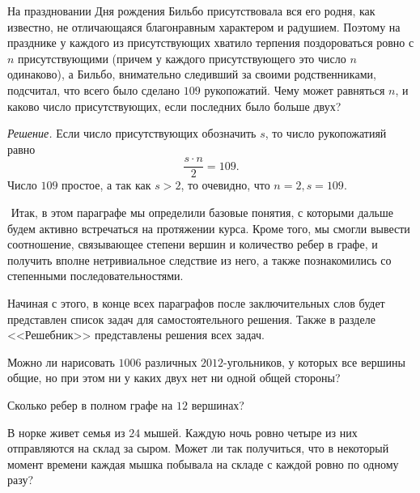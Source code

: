 \begin{example}
	На праздновании Дня рождения Бильбо присутствовала вся его родня, как известно, не отличающаяся благонравным характером и радушием. 
	Поэтому на празднике у каждого из присутствующих хватило терпения поздороваться ровно с $n$ присутствующими 
	(причем у каждого присутствующего это число $n$ одинаково), а Бильбо, внимательно следивший за своими родственниками, 
	подсчитал, что всего было сделано $109$ рукопожатий. Чему может равняться $n$, и каково число присутствующих, если последних было больше двух?
	
	\emph{Решение.} Если число присутствующих обозначить $s$, то число рукопожатияй равно $$\frac{s \cdot n}{2} = 109.$$
	Число $109$ простое, а так как $s > 2$, то очевидно, что $n = 2, s = 109$.	
\end{example}

$ $
\newline
	Итак, в этом параграфе мы определили базовые понятия, с которыми дальше будем активно встречаться на протяжении курса. 
	Кроме того, мы смогли вывести соотношение, связывающее степени вершин и количество ребер в графе, 
	и получить вполне нетривиальное следствие из него, а также познакомились со степенными последовательностями.
	
	Начиная с этого, в конце всех параграфов после заключительных слов будет представлен список задач для самостоятельного решения. 
	Также в разделе <<Решебник>> представлены решения всех задач.
		
\newpage
{}

\begin{exersize}
	Можно ли нарисовать $1006$ различных $2012$-угольников, у которых все вершины общие, но при этом ни у каких двух нет ни одной общей стороны?
\end{exersize}

\begin{exersize}
	Сколько ребер в полном графе на $12$ вершинах?
\end{exersize}

\begin{exersize}
	В норке живет семья из $24$ мышей. Каждую ночь ровно четыре из них отправляются на склад за сыром. 
	Может ли так получиться, что в некоторый момент времени каждая мышка побывала на складе с каждой ровно по одному разу?
\end{exersize}

